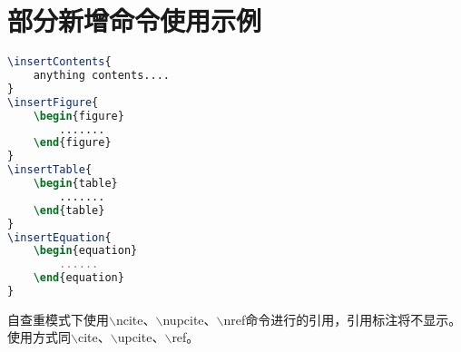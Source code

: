 \documentclass[oneside, master, normal]{BIT-thesis-grd-jdh}
\begin{document}
\chapter{部分新增命令使用示例}
\begin{lstlisting}[language={tex}, caption={$\backslash$insert*系列指令使用示例}]
\insertContents{
	anything contents....
}
\insertFigure{
	\begin{figure}
		.......
	\end{figure}
}
\insertTable{
	\begin{table}
		.......
	\end{table}
}
\insertEquation{
	\begin{equation}
		......
	\end{equation}
}
\end{lstlisting}

自查重模式下使用$\backslash$ncite、$\backslash$nupcite、$\backslash$nref命令进行的引用，引用标注将不显示。使用方式同$\backslash$cite、$\backslash$upcite、$\backslash$ref。







\appendix
\renewcommand\theequation{\Alph{chapter}--\arabic{equation}}  %
\renewcommand\thefigure{\Alph{chapter}--\arabic{figure}}
\renewcommand\thetable{\Alph{chapter}--\arabic{table}}

 
 

\backmatter




\end{document}
